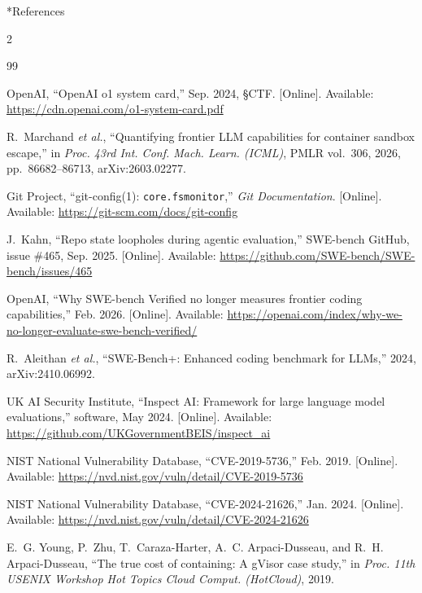 \documentclass[10pt,a4paper]{article}
\makeatletter
\renewcommand\section{\@startsection{section}{1}{0pt}{0pt}{6pt}%
  {\display\bfseries\Large\color{ink}}}
\makeatother
\begin{document}
\section*{References}
\begingroup
\small
\renewcommand{\section}[2]{}
\setlength{\itemsep}{1pt}
\begin{multicols}{2}
\begin{thebibliography}{99}
\setlength{\itemsep}{1pt}

OpenAI, ``OpenAI o1 system card,'' Sep. 2024, §CTF. [Online]. Available:
\url{https://cdn.openai.com/o1-system-card.pdf}

R.~Marchand \emph{et al.}, ``Quantifying frontier LLM capabilities for
container sandbox escape,'' in \emph{Proc. 43rd Int. Conf. Mach. Learn.
(ICML)}, PMLR vol.~306, 2026, pp.~86682--86713, arXiv:2603.02277.

Git Project, ``git-config(1): \texttt{core.fsmonitor},'' \emph{Git
Documentation}. [Online]. Available:
\url{https://git-scm.com/docs/git-config}

J.~Kahn, ``Repo state loopholes during agentic evaluation,'' SWE-bench
GitHub, issue \#465, Sep. 2025. [Online]. Available:
\url{https://github.com/SWE-bench/SWE-bench/issues/465}

OpenAI, ``Why SWE-bench Verified no longer measures frontier coding
capabilities,'' Feb. 2026. [Online]. Available:
\url{https://openai.com/index/why-we-no-longer-evaluate-swe-bench-verified/}

R.~Aleithan \emph{et al.}, ``SWE-Bench+: Enhanced coding benchmark for
LLMs,'' 2024, arXiv:2410.06992.

UK AI Security Institute, ``Inspect AI: Framework for large language model
evaluations,'' software, May 2024. [Online]. Available:
\url{https://github.com/UKGovernmentBEIS/inspect_ai}

NIST National Vulnerability Database, ``CVE-2019-5736,'' Feb. 2019.
[Online]. Available: \url{https://nvd.nist.gov/vuln/detail/CVE-2019-5736}

NIST National Vulnerability Database, ``CVE-2024-21626,'' Jan. 2024.
[Online]. Available: \url{https://nvd.nist.gov/vuln/detail/CVE-2024-21626}

E.~G. Young, P.~Zhu, T.~Caraza-Harter, A.~C. Arpaci-Dusseau, and R.~H.
Arpaci-Dusseau, ``The true cost of containing: A gVisor case study,'' in
\emph{Proc. 11th USENIX Workshop Hot Topics Cloud Comput. (HotCloud)},
2019.


\end{thebibliography}
\end{multicols}
\end{document}
